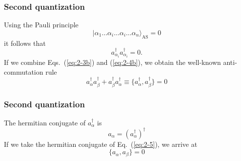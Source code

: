 \documentclass{beamer}
\begin{document}
\begin{frame}
\frametitle{Second quantization}

\begin{block}{}
Using the Pauli principle
\begin{equation}
	|\alpha_1\dots \alpha_i\dots \alpha_i\dots \alpha_n\rangle_{\mathrm{AS}} = 0 \label{eq:2-4a}
\end{equation}
it follows that
\begin{equation}
	a_{\alpha_i}^{\dagger}  a_{\alpha_i}^{\dagger} = 0. \label{eq:2-4b}
\end{equation}
If we combine Eqs.~(\ref{eq:2-3b}) and (\ref{eq:2-4b}), we obtain the well-known anti-commutation rule
\begin{equation}
	a_{\alpha}^{\dagger}  a_{\beta}^{\dagger} + a_{\beta}^{\dagger}  a_{\alpha}^{\dagger} \equiv 
		\{a_{\alpha}^{\dagger},a_{\beta}^{\dagger}\} = 0 \label{eq:2-5}
\end{equation}
\end{block}
\end{frame}

\begin{frame}
\frametitle{Second quantization}

\begin{block}{}
The hermitian conjugate  of $a_\alpha^{\dagger}$ is
\begin{equation}
	a_{\alpha} = ( a_{\alpha}^{\dagger} )^{\dagger} \label{eq:2-6}
\end{equation}
If we take the hermitian conjugate of Eq.~(\ref{eq:2-5}), we arrive at 
\begin{equation}
	\{a_{\alpha},a_{\beta}\} = 0 \label{eq:2-7}
\end{equation}
\end{block}
\end{frame}
\end{document}
